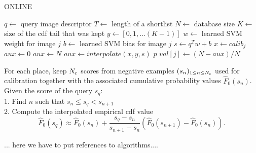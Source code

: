        \begin{algorithm}
         \caption{ONLINE}\label{alg:online}
         \begin{algorithmic}[1]
         \State $q \gets$ query image descriptor
         \State $T \gets$ length of a shortlist
         \State $N \gets$ database size
         \State $K \gets$ size of the cdf tail that was kept
         \State $y \gets [0,1,\dots (K-1)]$
            \State $w \gets$ learned SVM weight for image $j$
            \State $b \gets$ learned SVM bias for image $j$
            \State $s \gets q^Tw+b$
            \State $x \gets calib_j$
               \State $aux \gets 0$
               \State $aux \gets N$
            \Else
               \State $aux \gets interpolate(x,y,s)$
            \EndIf
            \State $p\_val[j] \gets (N-aux)/N$
         \EndFor
         \EndProcedure
         \end{algorithmic}
      \end{algorithm}

      For each place, keep $N_{\text{c}}$ scores from negative examples $(s_n)_{1 \leq n \leq N_{\text{c}}}$ used for calibration together with the associated cumulative probability values $\hat{F}_0(s_n)$.
      Given the score of the query $s_q$:\\
      1.  Find $n$ such that $s_{n} \leq s_q < s_{n+1} $\\
      2.  Compute the interpolated empirical cdf value
      \begin{equation}
        \hat{F}_0(s_q)\approx 
        \hat{F}_0(s_n)+\frac{s_q-s_n}{s_{n+1}-s_n} (\hat{F}_0(s_{n+1})-\hat{F}_0(s_n)).
        \label{eq:interp}
      \end{equation}

      ... here we have to put references to algorithms....
